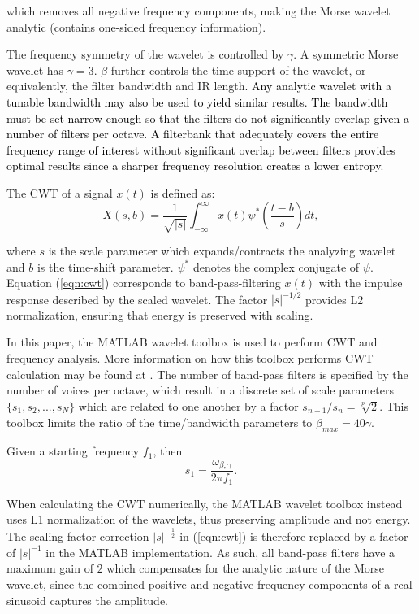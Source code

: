 \noindent which removes all negative frequency components, making the Morse wavelet analytic (contains one-sided frequency information).

The frequency symmetry of the wavelet is controlled by $\gamma$. A symmetric Morse wavelet has $\gamma = 3$. $\beta$ further controls the time support of the wavelet, or equivalently, the filter bandwidth and IR length. \textcolor{black}{Any analytic wavelet with a tunable bandwidth may also be used to yield similar results. The bandwidth must be set narrow enough so that the filters do not significantly overlap given a number of filters per octave. A filterbank that adequately covers the entire frequency range of interest without significant overlap between filters provides optimal results since a sharper frequency resolution creates a lower entropy.}

The CWT of a signal $x(t)$ is defined as:
\begin{equation}
	\label{eqn:cwt}
	X(s,b) = \frac{1}{\sqrt{|s|}} \int_{-\infty}^{\infty} x(t) \psi^*\left(\frac{t-b}{s}\right) dt,
\end{equation}

\noindent where $s$ is the scale parameter which expands/contracts the analyzing wavelet and $b$ is the time-shift parameter.  $\psi^*$ denotes the complex conjugate of $\psi$. Equation (\ref{eqn:cwt}) corresponds to band-pass-filtering $x(t)$ with the impulse response described by the scaled wavelet. The factor $|s|^{-1/2}$ provides L2 normalization, ensuring that energy is preserved with scaling.

In this paper, the MATLAB wavelet toolbox is used to perform CWT and frequency analysis. More information on how this toolbox performs CWT calculation may be found at \citep{cwtmatlab}. The number of band-pass filters is specified by the number of voices per octave, which result in a discrete set of scale parameters $\{s_1, s_2, ..., s_N\}$ which are related to one another by a factor $s_{n+1} / s_n = \sqrt[p]{2}$. This toolbox limits the ratio of the time/bandwidth parameters to $\beta_{max} = 40\gamma$. 

Given a starting frequency $f_1$, then
\begin{equation*}
	s_1 =  \frac{\omega_{\beta,\gamma}}{2\pi  f_1 } .
\end{equation*}

When calculating the CWT numerically, the MATLAB wavelet toolbox instead uses L1 normalization of the wavelets, thus preserving amplitude and not energy. The  scaling factor correction $|s|^{-\frac{1}{2}}$ in (\ref{eqn:cwt}) is therefore replaced by a factor of $|s|^{-1}$ in the MATLAB implementation. As such, all band-pass filters have a maximum gain of $2$ which compensates for the analytic nature of the Morse wavelet, since the combined positive and negative frequency components of a real sinusoid captures the amplitude.

